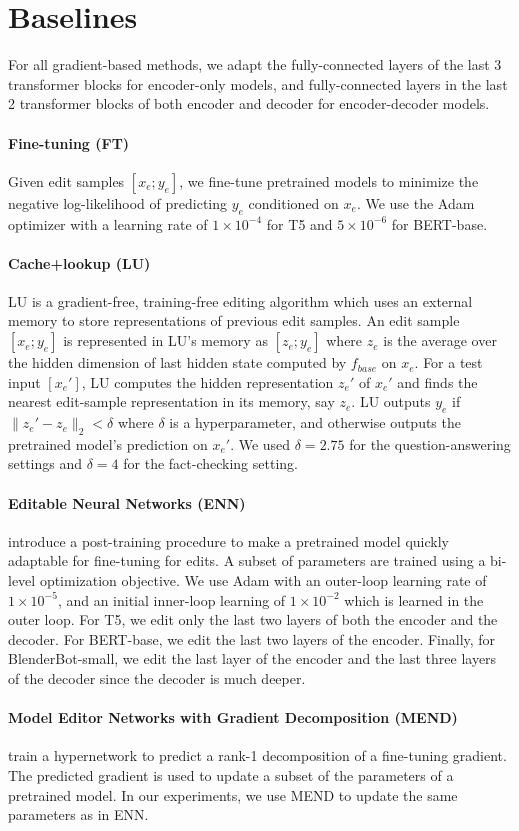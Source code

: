 \section{Baselines}
\label{sec:baselines}

For all gradient-based methods, we adapt the fully-connected layers of the last 3 transformer blocks for encoder-only models, and fully-connected layers in the last 2 transformer blocks of both encoder and decoder for encoder-decoder models.

\paragraph{Fine-tuning (FT)}
Given edit samples $[x_e; y_e]$, we fine-tune pretrained models to minimize the negative log-likelihood of predicting $y_e$ conditioned on $x_e$. We use the Adam optimizer with a learning rate of $1\times 10^{-4}$ for T5 and $5\times 10^{-6}$ for BERT-base. 

\paragraph{Cache+lookup (LU)}
LU \cite{mitchell2021fast} is a gradient-free, training-free editing algorithm which uses an external memory to store representations of previous edit samples. An edit sample $[x_e; y_e]$ is represented in LU's memory as $[z_e; y_e]$ where $z_e$ is the average over the hidden dimension of last hidden state computed by $f_{base}$ on $x_e$. For a test input $[x_e']$, LU computes the hidden representation $z_e'$ of $x_e'$ and finds the nearest edit-sample representation in its memory, say $z_e$. LU outputs $y_e$ if $\|z_e' - z_e\|_2 < \delta$ where $\delta$ is a hyperparameter, and otherwise outputs the pretrained model's prediction on $x_e'$. We used $\delta = 2.75$ for the question-answering settings and $\delta = 4$ for the fact-checking setting.

\paragraph{Editable Neural Networks (ENN)}
\cite{Sinitsin2020Editable} introduce a post-training procedure to make a pretrained model quickly adaptable for fine-tuning for edits. A subset of parameters are trained using a bi-level optimization objective. We use Adam with an outer-loop learning rate of $1\times 10^{-5}$, and an initial inner-loop learning of $1\times 10^{-2}$ which is learned in the outer loop. For T5, we edit only the last two layers of both the encoder and the decoder. For BERT-base, we edit the last two layers of the encoder. Finally, for BlenderBot-small, we edit the last layer of the encoder and the last three layers of the decoder since the decoder is much deeper.

\paragraph{Model Editor Networks with Gradient Decomposition (MEND)}
\cite{mitchell2021fast} train a hypernetwork to predict a rank-1 decomposition of a fine-tuning gradient. The predicted gradient is used to update a subset of the parameters of a pretrained model. In our experiments, we use MEND to update the same parameters as in ENN.
